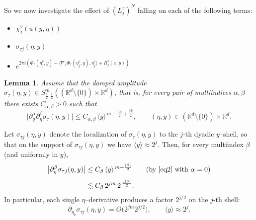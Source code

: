 \documentclass[12pt, reqno]{amsart}
\newtheorem{lemma}[theorem]{Lemma}
\theoremstyle{definition}
\theoremstyle{remark}
\numberwithin{equation}{section}
\begin{document}
So we now investigate the effect of  $(L_j^v)^N$ falling on each of the following terms:
\begin{itemize}
    \item  $\chi_j^v(u(y,\eta))$
    \item $\sigma_{ \tau j}(\eta,y)$
    \item $e^{2\pi i(\Phi_{\tau}(\eta_j^v,y)-\langle \nabla_1\Phi_{\tau}(\eta_j^v,y),\eta_j^v\rangle+R_j^v(x,y))}$
\end{itemize}

\begin{lemma}\label{lem1}
Assume that the damped amplitude $\sigma_{\tau}(\eta,y)\in S^m_{\frac{1}{2},\frac{1}{2}}((\mathbb{R}^d\setminus \{0\})\times \mathbb{R}^d) $, 
that is, for every pair of multiindices $\alpha,\beta$ there exists $C_{\alpha,\beta}>0$ such that
\begin{equation}\label{eq2}
\big|\partial_{y}^{\alpha}\partial_{\eta}^{\beta}\sigma_{\tau}(\eta,y)\big|
\le C_{\alpha,\beta}\,\langle y\rangle^{\,m-\frac{|\alpha|}{2}+\frac{|\beta|}{2}},
\qquad (\eta,y)\in(\mathbb{R}^d\setminus \{0\})\times \mathbb{R}^d.
\end{equation}
\end{lemma}
Let $\sigma_{\tau j}(\eta,y)$ denote the localization of $\sigma_{\tau}(\eta,y)$ to the $j$-th dyadic 
$y$–shell, so that on the support of $\sigma_{\tau j}(\eta,y)$ we have $\langle y\rangle\approx 2^{j}$. 
Then, for every multiindex $\beta$ (and uniformly in $y$),
\begin{align}\label{eq3}
\big|\partial_{\eta}^{\beta}\sigma_{\tau j}(\eta,y)\big|
&\le C_{\beta}\,\langle y \rangle^{\,m+\frac{|\beta|}{2}}
\qquad\text{(by \eqref{eq2} with }\alpha=0\text{)}\\[4pt]
&\lesssim C_{\beta}\,2^{jm}\,2^{\,\frac{j|\beta|}{2}}.\nonumber
\end{align}
In particular, each single $\eta$–derivative produces a factor $2^{j/2}$ on the $j$-th shell:
\[
\partial_{\eta_k}\sigma_{\tau j}(\eta,y)=O\big(2^{jm}2^{j/2}\big),
\qquad \langle y \rangle\approx 2^{j}.
\]
\end{document}
